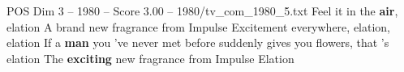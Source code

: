 \begin{textsample}{POS Dim 3 – 1980 – Score 3.00 – 1980/tv\_com\_1980\_5.txt}  \label{ex:f3_pos_052}
Feel it in the \textbf{air}, elation A brand new fragrance from Impulse Excitement everywhere, elation, elation If a \textbf{man} you 've never met before suddenly gives you flowers, that 's elation The \textbf{exciting} new fragrance from Impulse Elation

\end{textsample}
